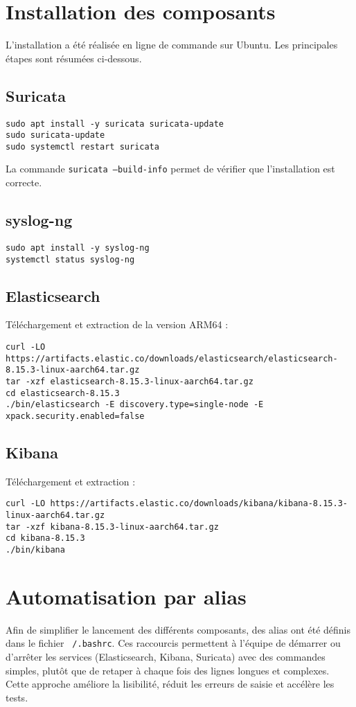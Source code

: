\section{Installation des composants}
L’installation a été réalisée en ligne de commande sur Ubuntu. Les principales étapes sont résumées ci-dessous.

\subsection*{Suricata}
\begin{verbatim}
sudo apt install -y suricata suricata-update
sudo suricata-update
sudo systemctl restart suricata
\end{verbatim}
La commande \texttt{suricata --build-info} permet de vérifier que l’installation est correcte.

\subsection*{syslog-ng}
\begin{verbatim}
sudo apt install -y syslog-ng
systemctl status syslog-ng
\end{verbatim}

\subsection*{Elasticsearch}
Téléchargement et extraction de la version ARM64 :
\begin{lstlisting}[style=bashstyle]
curl -LO https://artifacts.elastic.co/downloads/elasticsearch/elasticsearch-8.15.3-linux-aarch64.tar.gz
tar -xzf elasticsearch-8.15.3-linux-aarch64.tar.gz
cd elasticsearch-8.15.3
./bin/elasticsearch -E discovery.type=single-node -E xpack.security.enabled=false
\end{lstlisting}

\subsection*{Kibana}
Téléchargement et extraction :
\begin{lstlisting}[style=bashstyle]
curl -LO https://artifacts.elastic.co/downloads/kibana/kibana-8.15.3-linux-aarch64.tar.gz
tar -xzf kibana-8.15.3-linux-aarch64.tar.gz
cd kibana-8.15.3
./bin/kibana
\end{lstlisting}

\section{Automatisation par alias}
Afin de simplifier le lancement des différents composants, des alias ont été définis dans le fichier \texttt{~/.bashrc}. 
Ces raccourcis permettent à l’équipe de démarrer ou d’arrêter les services (Elasticsearch, Kibana, Suricata) avec des commandes simples, 
plutôt que de retaper à chaque fois des lignes longues et complexes. 
Cette approche améliore la lisibilité, réduit les erreurs de saisie et accélère les tests.